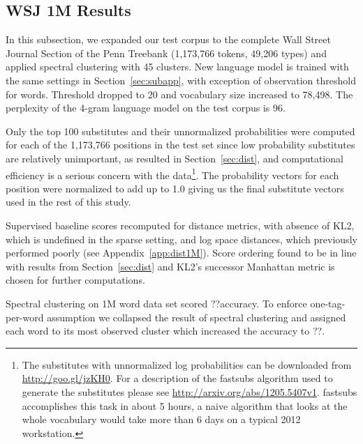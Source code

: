 \subsection{WSJ 1M Results}
\label{sec:wsj}

In this subsection, we expanded our test corpus to the complete Wall
Street Journal Section of the Penn Treebank \cite{treebank3}
(1,173,766 tokens, 49,206 types) and applied spectral clustering with
45 clusters.
%
New language model is trained with the same settings in
Section~\ref{sec:subapp}, with exception of observation threshold for
words.  Threshold dropped to 20 and vocabulary size increased to
78,498.
%
The perplexity of the 4-gram language model on the test corpus is 96.

Only the top 100 substitutes and their unnormalized probabilities were
computed for each of the 1,173,766 positions in the test set since low
probability substitutes are relatively unimportant, as resulted in
Section~\ref{sec:dist}, and computational efficiency is a serious
concern with the data\footnote{The substitutes with unnormalized log
  probabilities can be downloaded from
  \mbox{\url{http://goo.gl/jzKH0}}.  For a description of the {\sc
    fastsubs} algorithm used to generate the substitutes please see
  \mbox{\url{http://arxiv.org/abs/1205.5407v1}}.  {\sc fastsubs}
  accomplishes this task in about 5 hours, a naive algorithm that
  looks at the whole vocabulary would take more than 6 days on a
  typical 2012 workstation.}.  The probability vectors for each
position were normalized to add up to 1.0 giving us the final
substitute vectors used in the rest of this study.

Supervised baseline scores recomputed for distance metrics, with
absence of KL2, which is undefined in the sparse setting, and log
space distances, which previously performed poorly
(see Appendix~\ref{app:dist1M}). Score ordering found to be in line with
results from Section~\ref{sec:dist} and KL2's successor Manhattan
metric is chosen for further computations.


Spectral clustering on 1M word data set scored ??\mto accuracy.  To
enforce one-tag-per-word assumption we collapsed the result of
spectral clustering and assigned each word to its most observed
cluster which increased the \mto accuracy to ??.

